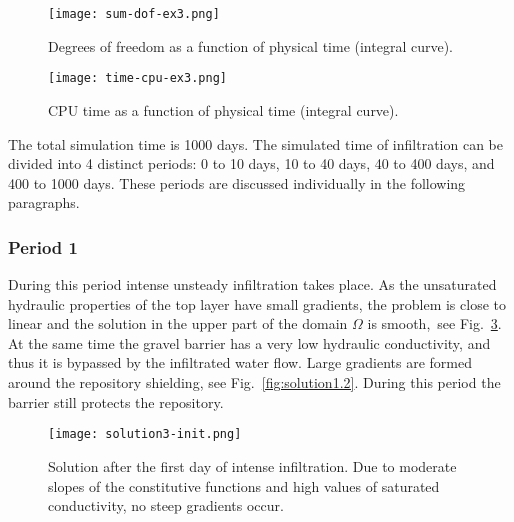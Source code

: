 \documentclass[final,3p,times,twocolumn]{elsarticle}
\begin{document}
\begin{figure}[!htb]
\begin{center}
\texttt{[image: sum-dof-ex3.png]}
\end{center}
\vspace{-4mm}
\caption{Degrees of freedom as a function of physical time (integral curve).}
\label{fig:sum-dofs-example3}
\end{figure}


\begin{figure}[!htb]
\begin{center}
\texttt{[image: time-cpu-ex3.png]}
\end{center}
\vspace{-4mm}
\caption{CPU time as a function of physical time (integral curve).}
\label{fig:cpu-time-example3}
\end{figure}


The total simulation time is 1000 days. The simulated time of infiltration can be divided 
into 4 distinct periods: 0 to 10 days, 10 to 40 days, 40 to 400 days, and 400 to 1000 days.
These periods are discussed individually in the following paragraphs.

\subsubsection{Period 1}

During this period intense unsteady infiltration takes place. As the unsaturated hydraulic 
properties of the top layer have small gradients, the problem is close to linear 
and the solution in the upper part of the domain $\Omega$ is smooth,~see 
Fig.~\ref{fig:solution1.1}. At the same time the gravel barrier has a very low hydraulic 
conductivity, and thus it is bypassed by the infiltrated water flow. Large gradients 
are formed around the repository shielding, see Fig.~\ref{fig:solution1.2}. During this 
period the barrier still protects the repository.\\

\begin{figure}[!htb]
\begin{center}
\texttt{[image: solution3-init.png]}
\end{center}
\vspace{-4mm}
\caption{Solution after the first day of intense infiltration. Due to moderate slopes of the constitutive functions and high values of saturated conductivity, no steep gradients occur.}
\label{fig:solution1.1}
\end{figure}
\end{document}
